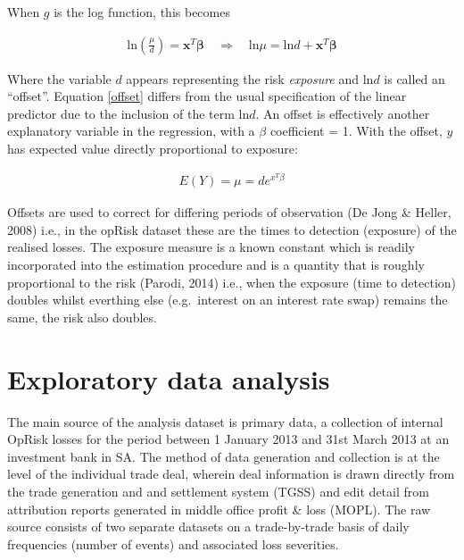 \documentclass{DissertateUSU}
\begin{document}
When \(g\) is the log function, this becomes

\singlespacing

\begin{eqnarray}\label{offset}
\mbox{ln}\left(\frac{\mu}{d}\right) = \mathbf{x}^T\mathbf{\beta} \quad \Rightarrow \quad \mbox{ln}\mu = \mbox{ln}d + \mathbf{x}^T\mathbf{\beta}
\end{eqnarray} \doublespacing

Where the variable \(d\) appears representing the risk \emph{exposure}
and ln\(d\) is called an ``offset''. Equation \ref{offset} differs from
the usual specification of the linear predictor due to the inclusion of
the term ln\(d\). An offset is effectively another explanatory variable
in the regression, with a \(\beta\) coefficient = 1. With the offset,
\(y\) has expected value directly proportional to exposure:

\singlespacing

\begin{eqnarray}
E(Y) = \mu = d e^{x^T\beta}
\end{eqnarray} \doublespacing

Offsets are used to correct for differing periods of observation (De
Jong \& Heller, 2008) i.e., in the opRisk dataset these are the times to
detection (exposure) of the realised losses. The exposure measure is a
known constant which is readily incorporated into the estimation
procedure and is a quantity that is roughly proportional to the risk
(Parodi, 2014) i.e., when the exposure (time to detection) doubles
whilst everthing else (e.g.~interest on an interest rate swap) remains
the same, the risk also doubles.

\section{Exploratory data analysis}
\label{sec:Exploratory data analysis}

The main source of the analysis dataset is primary data, a collection of
internal OpRisk losses for the period between 1 January 2013 and 31st
March 2013 at an investment bank in SA. The method of data generation
and collection is at the level of the individual trade deal, wherein
deal information is drawn directly from the trade generation and and
settlement system (TGSS) and edit detail from attribution reports
generated in middle office profit \& loss (MOPL). The raw source
consists of two separate datasets on a trade-by-trade basis of daily
frequencies (number of events) and associated loss severities.\medskip
\end{document}
